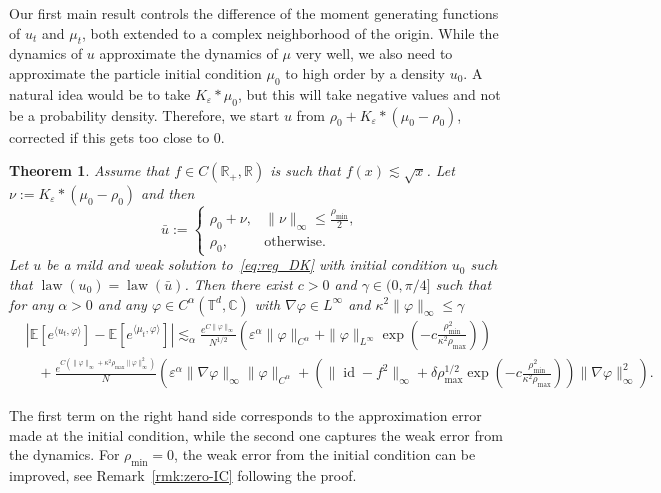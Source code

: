 \documentclass[a4paper,12pt]{article}
\newtheorem{theorem}{Theorem}[section]
\newcommand{\R}{\mathbb{R}}
\newcommand{\T}{\mathbb{T}}
\newcommand{\C}{\mathbb{C}}
\begin{document}
Our first main result controls the difference of the moment generating functions of $u_t$ and $\mu_t$, both extended to a complex neighborhood of the origin. While the dynamics of $u$ approximate the dynamics of $\mu$ very well, we also need to approximate the particle initial condition $\mu_0$ to high order by a density $u_0$. A natural idea would be to take $K_\varepsilon\ast \mu_0$, but this will take negative values and  not be a probability density. Therefore, we start $u$ from $\rho_0 + K_\varepsilon\ast (\mu_0 - \rho_0)$, corrected if this gets too close to $0$.

\begin{theorem}\label{thm:main-nonlocal-testfunction}
  Assume that $f \in C(\R_+,\R)$ is such that $f (x) \lesssim \sqrt{x}$. Let $\nu := K_\varepsilon *(\mu_0-\rho_0)$ and then
  \[
    \bar{u} := \begin{cases}
        \rho_0 + \nu,
        & \|\nu\|_\infty \leq \frac{\rho_{\min}}{2},\\
        \rho_0,
        & \text{otherwise}.
        \end{cases}
  \]
  Let $u$ be a mild and weak solution to~\eqref{eq:reg_DK}  with initial condition $u_0$ such that $\operatorname{law}(u_0) = \operatorname{law}(\bar u)$. Then there exist $c > 0$ and $\gamma \in (0,\pi/4]$ such that for any $\alpha > 0$ and any $\varphi \in C^{\alpha}(\T^d, \C)$ with $\nabla \varphi \in L^\infty$ and $\kappa^2 \| \varphi\|_\infty \leq \gamma$
  \begin{align} \label{eq:main}
    &| \mathbb{E} [e^{\langle u_t, \varphi \rangle}] -\mathbb{E} [e^{\langle
    \mu_t, \varphi \rangle}] |  \lesssim_{\alpha} \frac{e^{C\|\varphi\|_\infty}}{N^{1/2}}\left(\varepsilon^\alpha \|\varphi\|_{C^\alpha}
        + \|\varphi\|_{L^\infty} 
        \exp\left(-c \frac{\rho_{\min}^2}{\kappa^2\rho_{\max}}\right)\right)\\ \nonumber
    & \hspace{10pt}+ \frac{e^{C (\| \varphi \|_{\infty} + \kappa^2 \rho_{\max} \| \varphi \|_{\infty}^2 )}}{N}
    \left(\varepsilon^{\alpha} \|\nabla \varphi\|_\infty \| \varphi \|_{C^{\alpha}} + (\| \operatorname{id} - f^2 \|_{\infty} + \delta \rho_{\max}^{1/2} \exp\left(-c \frac{\rho_{\min}^2}{\kappa^2\rho_{\max}}\right)) \| \nabla \varphi \|_{\infty}^2\right). 
  \end{align}
\end{theorem}

The first term on the right hand side corresponds to the approximation error made at the initial condition, while the second one captures the weak error from the dynamics. For $\rho_{\min}=0$, the weak error from the initial condition can be improved, see Remark~\ref{rmk:zero-IC} following  the proof.
\end{document}
